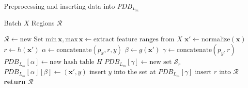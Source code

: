 \documentclass[../../main.tex]{subfiles}
\begin{document}
\begin{algorithm}
    \caption[Local Indexing Service]{Preprocessing and inserting data into $PDB_{L_m}$}
    \label{alg:indexing}

    \begin{algorithmic}[1]
        \REQUIRE Batch $X$
        \ENSURE Regions $\mathcal{R}$

        \STATE $\mathcal{R} \leftarrow \text{new Set}$
        \STATE $\text{min}\,\bm{x}, \text{max}\,\bm{x} \leftarrow \text{extract feature ranges from } X$
            \STATE $\bm{x}' \leftarrow \text{normalize}(\bm{x})$ 
            \STATE $r \leftarrow h(\bm{x}')$
            \STATE $\alpha \leftarrow \text{concatenate}(p_x, r, y)$ \label{alg:indexing_kalpha}
            \STATE $\beta \leftarrow g(\bm{x}')$ \label{alg:indexing_kbeta}
            \STATE $\gamma \leftarrow \text{concatenate}(p_y,r)$ \label{alg:indexing_kgamma}
                \STATE $PDB_{L_m}[\alpha] \leftarrow \text{new hash table } H$
            \ENDIF
                \STATE $PDB_{L_m}[\gamma] \leftarrow \text{new set } \mathcal{S}_r$
            \ENDIF
            \STATE $PDB_{L_m}[\alpha][\beta] \leftarrow (\bm{x}', y)$
            \STATE insert $y$ into the set at $PDB_{L_m}[\gamma]$
            \STATE $\text{insert } r \text{ into } \mathcal{R}$
            \ENDIF         
        \ENDFOR
        \STATE \textbf{return} $\mathcal{R}$
    \end{algorithmic}
\end{algorithm}
\end{document}
